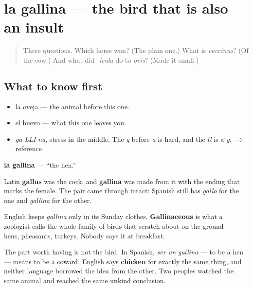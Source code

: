 \section[la gallina]{la gallina — the bird that is also an insult}

\label{lesson:ES-C296-gallina}



\begin{quote}
Three questions. Which horse won? (The plain one.) What is \emph{vaccinus}? (Of the cow.) And what did \emph{-icula} do to \emph{ovis}? (Made it small.)
\end{quote}

\subsection*{What to know first}
\begin{itemize}
\raggedright
  \item la oveja — the animal before this one.
  \item el huevo — what this one leaves you.
\end{itemize}

\begin{sounds}
\begin{itemize}
\raggedright
  \item \emph{ga-LLI-na}, stress in the middle. The \emph{g} before \emph{a} is hard, and the \emph{ll} is a \emph{y}. $\to$ reference
\end{itemize}
\end{sounds}

\begin{cousinweb}
\textbf{la gallina} — \textquotedblleft{}the hen.\textquotedblright{}

Latin \textbf{gallus} was the cock, and \textbf{gallina} was made from it with the ending that marks the female. The pair came through intact: Spanish still has \emph{gallo} for the one and \emph{gallina} for the other.

English keeps \emph{gallina} only in its Sunday clothes. \textbf{Gallinaceous} is what a zoologist calls the whole family of birds that scratch about on the ground — hens, pheasants, turkeys. Nobody says it at breakfast.

The part worth having is not the bird. In Spanish, \emph{ser un gallina} — to be a hen — means to be a coward. English says \textbf{chicken} for exactly the same thing, and neither language borrowed the idea from the other. Two peoples watched the same animal and reached the same unkind conclusion.
\end{cousinweb}


